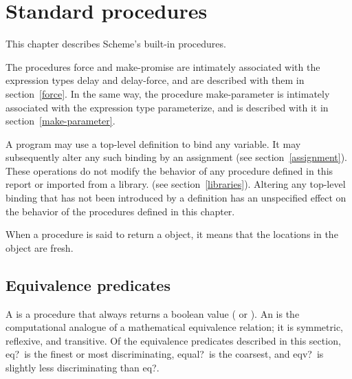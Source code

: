 
\chapter{Standard procedures}
\label{initialenv}
\label{builtinchapter}


This chapter describes Scheme's built-in procedures.  

The procedures {\cf force} and {\cf make-promise} are intimately associated
with the expression types {\cf delay} and {\cf delay-force}, and are described
with them in section~\ref{force}.  In the same way, the procedure
{\cf make-parameter} is intimately associated with the expression type
{\cf parameterize}, and is described with it in section~\ref{make-parameter}.

A program may use a top-level definition to bind any variable.  It may
subsequently alter any such binding by an assignment (see
section~\ref{assignment}).  These operations do not modify the behavior of
any procedure defined in this report or imported from a library.
(see section~\ref{libraries}).  Altering any top-level binding that has
not been introduced by a definition has an unspecified effect on the
behavior of the procedures defined in this chapter.

When a procedure is said to return a  object,
it means that the locations in the object are fresh.

\section{Equivalence predicates}
\label{equivalencesection}

A  is a procedure that always returns a boolean
value (\schtrue{} or \schfalse).  An  is
the computational analogue of a mathematical equivalence relation; it is
symmetric, reflexive, and transitive.  Of the equivalence predicates
described in this section, {\cf eq?}\ is the finest or most
discriminating, {\cf equal?}\ is the coarsest, and {\cf eqv?}\ is
slightly less discriminating than {\cf eq?}.  


